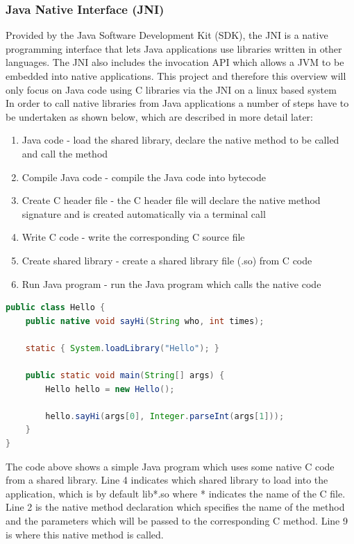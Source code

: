 \documentclass[a4paper, titlepage]{article}
\begin{document}
\subsubsection{Java Native Interface (JNI)}
Provided by the Java Software Development Kit (SDK), the JNI is a native programming interface that lets Java applications use libraries written in other languages. The JNI also includes the invocation API which allows a JVM to be embedded into native applications. This project and therefore this overview will only focus on Java code using C libraries via the JNI on a linux based system\\
\newline
In order to call native libraries from Java applications a number of steps have to be undertaken as shown below, which are described in more detail later:
\begin{enumerate}
	\item Java code - load the shared library, declare the native method to be called and call the method
	\item Compile Java code - compile the Java code into bytecode
	\item Create C header file - the C header file will declare the native method signature and is created automatically via a terminal call
	\item Write C code - write the corresponding C source file
	\item Create shared library - create a shared library file (.so) from C code
	\item Run Java program - run the Java program which calls the native code
\end{enumerate}

\begin{lstlisting}[language=Java]
public class Hello {
    public native void sayHi(String who, int times);

    static { System.loadLibrary("Hello"); }

    public static void main(String[] args) {
        Hello hello = new Hello();
        
        hello.sayHi(args[0], Integer.parseInt(args[1]));
    }
}
\end{lstlisting}
The code above shows a simple Java program which uses some native C code from a shared library. Line 4 indicates which shared library to load into the application, which is by default lib*.so where * indicates the name of the C file. Line 2 is the native method declaration which specifies the name of the method and the parameters which will be passed to the corresponding C method. Line 9 is where this native method is called.
\end{document}
